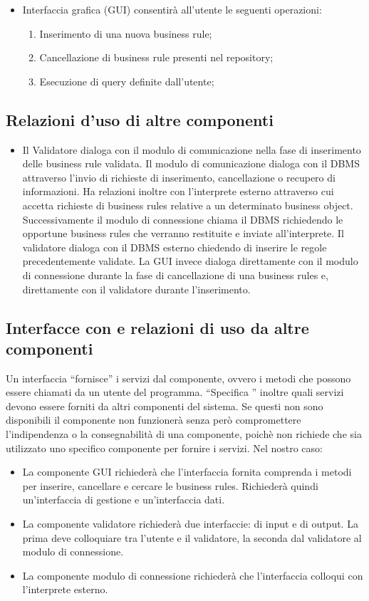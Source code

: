 \documentclass[11pt,titlepage,a4paper]{report}
\begin{document}
\begin{itemize}
\item Interfaccia grafica (GUI) consentir\`a all'utente le seguenti operazioni:
\begin{enumerate}
\item Inserimento di una nuova business rule;
\item Cancellazione di business rule presenti nel repository;
\item Esecuzione di query definite dall'utente;
\end{enumerate}

\end{itemize}

\subsection{Relazioni d'uso di altre componenti}
\begin{itemize}
\item{Il Validatore dialoga con il modulo di comunicazione nella fase di inserimento delle business rule validata. }
Il modulo di comunicazione dialoga con il DBMS attraverso l'invio di richieste di inserimento, cancellazione o recupero di informazioni. Ha relazioni inoltre con l'interprete esterno attraverso cui accetta richieste di business rules relative a un determinato business object. Successivamente il modulo di connessione chiama il DBMS richiedendo le opportune business rules che verranno restituite e inviate all'interprete. Il validatore dialoga con il DBMS esterno chiedendo di inserire le regole precedentemente validate. La GUI invece dialoga direttamente con il modulo di connessione durante la fase di cancellazione di una business rules e, direttamente con il validatore durante l'inserimento.
\end{itemize}
\subsection{Interfacce con e relazioni di uso da altre componenti}
Un interfaccia ``fornisce'' i servizi dal componente, ovvero i metodi che possono essere chiamati da un utente del programma. ``Specifica '' inoltre quali servizi devono essere forniti da altri componenti del sistema. Se questi non sono disponibili il componente non funzioner\`a senza per\`o compromettere l'indipendenza o la consegnabilit\`a di una componente, poich\`e non richiede che sia utilizzato uno specifico componente per fornire i servizi. Nel nostro caso:
\begin{itemize}
\item La componente GUI richieder\`a che l'interfaccia fornita comprenda i metodi per inserire, cancellare e cercare le business rules. Richieder\`a quindi un'interfaccia di gestione e un'interfaccia dati.
\item La componente validatore richieder\`a due interfaccie: di input e di output. La prima deve colloquiare tra l'utente e il validatore, la seconda dal validatore al modulo di connessione.
\item La componente modulo di connessione richieder\`a che l'interfaccia colloqui con l'interprete esterno.
\end{itemize}
\end{document}
